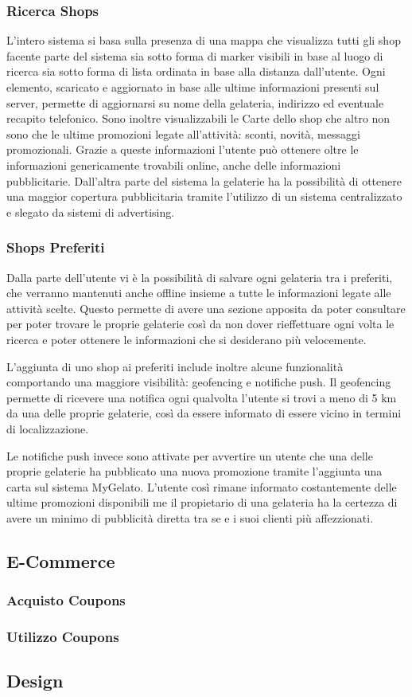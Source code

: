 \subsubsection{Ricerca Shops}
L'intero sistema si basa sulla presenza di una mappa che visualizza tutti gli shop facente parte del sistema sia sotto forma di marker visibili in base al luogo di ricerca sia sotto forma di lista ordinata in base alla distanza dall'utente.
Ogni elemento, scaricato e aggiornato in base alle ultime informazioni presenti sul server, permette di aggiornarsi su nome della gelateria, indirizzo ed eventuale recapito telefonico.
Sono inoltre visualizzabili le Carte dello shop che altro non sono che le ultime promozioni legate all'attività: sconti, novità, messaggi promozionali.
Grazie a queste informazioni l'utente può ottenere oltre le informazioni genericamente trovabili online, anche delle informazioni pubblicitarie.
Dall'altra parte del sistema la gelaterie ha la possibilità di ottenere una maggior copertura pubblicitaria tramite l'utilizzo di un sistema centralizzato e slegato da sistemi di advertising.

\subsubsection{Shops Preferiti}
Dalla parte dell'utente vi è la possibilità di salvare ogni gelateria tra i preferiti, che verranno mantenuti anche offline insieme a tutte le informazioni legate alle attività scelte.
Questo permette di avere una sezione apposita da poter consultare per poter trovare le proprie gelaterie così da non dover rieffettuare ogni volta le ricerca e poter ottenere le informazioni che si desiderano più velocemente.

L'aggiunta di uno shop ai preferiti include inoltre alcune funzionalità comportando una maggiore visibilità: geofencing e notifiche push.
Il geofencing permette di ricevere una notifica ogni qualvolta l'utente si trovi a meno di 5 km da una delle proprie gelaterie, così da essere informato di essere vicino in termini di localizzazione.

Le notifiche push invece sono attivate per avvertire un utente che una delle proprie gelaterie ha pubblicato una nuova promozione tramite l'aggiunta una carta sul sistema MyGelato.
L'utente così rimane informato costantemente delle ultime promozioni disponibili me il propietario di una gelateria ha la certezza di avere un minimo di pubblicità diretta tra se e i suoi clienti più affezzionati.

\subsection{E-Commerce}

\subsubsection{Acquisto Coupons}

\subsubsection{Utilizzo Coupons}

\subsection{Design}

\newpage